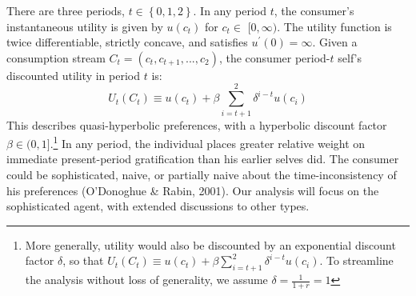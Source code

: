 \documentclass[11pt]{article}%
\begin{document}
There are three periods, $t\in\left\{  0,1,2\right\}  $. In any period $t$,
the consumer's instantaneous utility is given by $u\left(  c_{t}\right)  $ for
$c_{t}\in$ $[0,\infty)$. The utility function is twice differentiable,
strictly concave, and satisfies $u^{\prime}\left(  0\right)  =\infty$. Given a
consumption stream $C_{t}=\left(  c_{t},c_{t+1},...,c_{2}\right)  $,
the consumer period-$t$ self's discounted utility in period $t$ is:%
\[
U_{t}\left(  C_{t}\right)  \equiv u\left(  c_{t}\right)  +\beta\sum
\limits_{i=t+1}^{2}\delta^{i-t}u\left(  c_{i}\right)
\]
This describes quasi-hyperbolic preferences, with a hyperbolic discount factor
$\beta\in(0,1]$.\footnote{More generally, utility would also be discounted by
an exponential discount factor $\delta$, so that $U_{t}\left(  C_{t}\right)
\equiv u\left(  c_{t}\right)  +\beta\sum\limits_{i=t+1}^{2}\delta
^{i-t}u\left(  c_{i}\right)  $. To streamline the analysis without loss of
generality, we assume $\delta=\frac{1}{1+r}=1$} In any period, the individual
places greater relative weight on immediate present-period gratification than
his earlier selves did. The consumer could be sophisticated, naive, or
partially naive about the time-inconsistency of his preferences (O'Donoghue \&
Rabin, 2001). Our analysis will focus on the sophisticated agent, with
extended discussions to other types.
\end{document}
